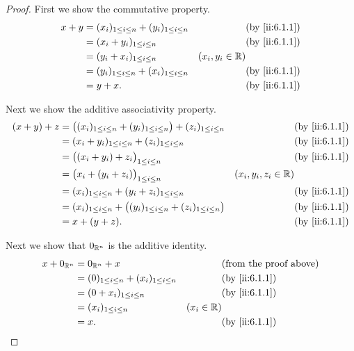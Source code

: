 \begin{proof}
  First we show the commutative property.
  \begin{align*}
    x + y & = (x_i)_{1 \leq i \leq n} + (y_i)_{1 \leq i \leq n} &                   & \by{ii:6.1.1} \\
          & = (x_i + y_i)_{1 \leq i \leq n}                     &                   & \by{ii:6.1.1} \\
          & = (y_i + x_i)_{1 \leq i \leq n}                     & (x_i, y_i \in \R)                 \\
          & = (y_i)_{1 \leq i \leq n} + (x_i)_{1 \leq i \leq n} &                   & \by{ii:6.1.1} \\
          & = y + x.                                            &                   & \by{ii:6.1.1}
  \end{align*}

  Next we show the additive associativity property.
  \begin{align*}
    (x + y) + z & = \big((x_i)_{1 \leq i \leq n} + (y_i)_{1 \leq i \leq n}\big) + (z_i)_{1 \leq i \leq n} &                        & \by{ii:6.1.1} \\
                & = (x_i + y_i)_{1 \leq i \leq n} + (z_i)_{1 \leq i \leq n}                               &                        & \by{ii:6.1.1} \\
                & = \big((x_i + y_i) + z_i\big)_{1 \leq i \leq n}                                         &                        & \by{ii:6.1.1} \\
                & = \big(x_i + (y_i + z_i)\big)_{1 \leq i \leq n}                                         & (x_i, y_i, z_i \in \R)                 \\
                & = (x_i)_{1 \leq i \leq n} + (y_i + z_i)_{1 \leq i \leq n}                               &                        & \by{ii:6.1.1} \\
                & = (x_i)_{1 \leq i \leq n} + \big((y_i)_{1 \leq i \leq n} + (z_i)_{1 \leq i \leq n}\big) &                        & \by{ii:6.1.1} \\
                & = x + (y + z).                                                                          &                        & \by{ii:6.1.1}
  \end{align*}

  Next we show that \(0_{\mathbb{R}^n}\) is the additive identity.
  \begin{align*}
    x + 0_{\R^n} & = 0_{\R^n} + x                                    &              & \text{(from the proof above)} \\
                 & = (0)_{1 \leq i \leq n} + (x_i)_{1 \leq i \leq n} &              & \by{ii:6.1.1}                 \\
                 & = (0 + x_i)_{1 \leq i \leq n}                     &              & \by{ii:6.1.1}                 \\
                 & = (x_i)_{1 \leq i \leq n}                         & (x_i \in \R)                                 \\
                 & = x.                                              &              & \by{ii:6.1.1}
  \end{align*}


\end{proof}
